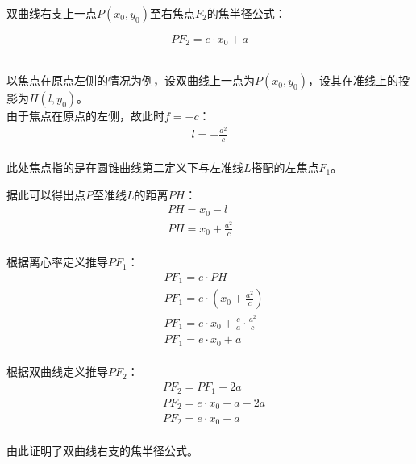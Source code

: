 \documentclass[UTF8]{ctexart}
\begin{document}
    双曲线右支上一点$P(x_0,y_0)$至右焦点$F_2$的焦半径公式：
    \begin{large}
        \begin{equation*}
            PF_2=e\cdot x_0+a
        \end{equation*}
    \end{large}\\
    以焦点在原点左侧的情况为例，设双曲线上一点为$P(x_0,y_0)$，设其在准线上的投影为$H(l,y_0)$。\\[3mm]
    由于焦点在原点的左侧，故此时$f=-c$：
    \begin{align}
        l=-\frac{a^2}{c}
    \end{align}\\
    此处焦点指的是在圆锥曲线第二定义下与左准线$L$搭配的左焦点$F_1$。

\newpage

    据此可以得出点$P$至准线$L$的距离$PH$：
    \begin{align}
        &PH=x_0-l\\[5mm]
        &PH=x_0+\frac{a^2}{c}~~~~~~~~~~~
    \end{align}\\
    根据离心率定义推导$PF_1$：
    \begin{align}
        &PF_1=e\cdot PH\\[5mm]
        &PF_1=e\cdot\left(x_0+\frac{a^2}{c}\right)\\[5mm]
        &PF_1=e\cdot x_0+\frac{c}{a}\cdot\frac{a^2}{c}\\[5mm]
        &PF_1=e\cdot x_0+a
    \end{align}\\
    根据双曲线定义推导$PF_2$：
    \begin{align}
        &PF_2=PF_1-2a\\[5mm]
        &PF_2=e\cdot x_0+a-2a\\[5mm]
        &PF_2=e\cdot x_0-a
    \end{align}\\
    由此证明了双曲线右支的焦半径公式。

\newpage
\end{document}
